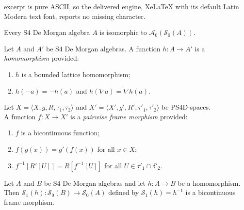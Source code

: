 \documentclass[10pt,a4paper]{amsart}
\begin{document}
excerpt is pure ASCII, so the delivered engine, XeLaTeX with its default Latin Modern text font, reports no missing character.
\begin{theorem}\label{rep thm}
    Every S4 De Morgan algebra $A$ is isomorphic to $\mathcal{A}_0(\mathcal{S}_0(A))$. 
\end{theorem}

\begin{definition} \label{De Morgan homomorphism}
    Let $A$ and $A'$ be S4 De Morgan algebras. A function $h\colon A\to A'$ is a \emph{homomorphism} provided: 
    \begin{enumerate}
        \item $h$ is a bounded lattice homomorphism; 
        \item $h(-a)=-h(a)$ and $h(\nabla a)=\nabla h(a)$. 
    \end{enumerate}
\end{definition}

\begin{definition}\label{parwise frame homomorphism}
    Let $X= \langle X, g, R, \tau_1, \tau_2 \rangle$ and $X' = \langle X', g', R', \tau'_1, \tau'_2 \rangle$ be PS4D-spaces. \\ A function $f\colon X\to X'$ is a \emph{pairwise frame morphism} provided:
    \begin{enumerate}
        \item $f$ is a bicontinuous function; 
        \item $f(g(x))=g'(f(x))$ for all $x\in X$; 
        \item $f^{-1}[R'[U]]=R[f^{-1}[U]]$ for all $U\in\tau'_1\cap\delta'_2$. 
    \end{enumerate}
\end{definition}

\begin{lemma}\label{homo to cont}
    Let $A$ and $B$ be S4 De Morgan algebras and let $h:A \to B$ be a homomorphism. Then $\mathcal{S}_1(h):\mathcal{S}_0(B) \to \mathcal{S}_0(A)$ defined by $\mathcal{S}_1(h)=h^{-1}$ is a bicontinuous frame morphism.
\end{lemma}
\end{document}
